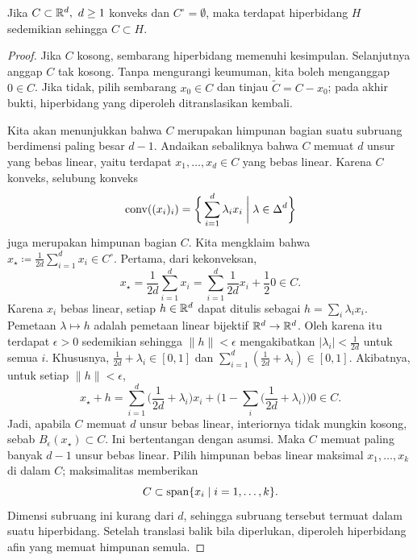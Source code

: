 \begin{lemma}
    Jika $C\subset\mathbb{R}^d,\ d\geq 1$ konveks dan $C^\circ=\emptyset$, maka terdapat hiperbidang $H$ sedemikian sehingga $C\subset H$.
\end{lemma}
\begin{proof}
    Jika \(C\) kosong, sembarang hiperbidang memenuhi kesimpulan. Selanjutnya anggap \(C\) tak kosong. Tanpa mengurangi keumuman, kita boleh menganggap $0\in C$. Jika tidak, pilih sembarang $x_0\in C$ dan tinjau $\widetilde{C}=C-x_0$; pada akhir bukti, hiperbidang yang diperoleh ditranslasikan kembali.

    Kita akan menunjukkan bahwa $C$ merupakan himpunan bagian suatu subruang berdimensi paling besar $d-1$. Andaikan sebaliknya bahwa $C$ memuat $d$ unsur yang bebas linear, yaitu terdapat $x_1,\dots,x_d\in C$ yang bebas linear. Karena $C$ konveks, selubung konveks
    \begin{equation}
        \operatorname{\mathrm{conv}}((x_i)_i)=\bigg\{ \sum_{i=1}^d\lambda_i x_i\;\bigg|\; \lambda\in \Delta^d\bigg\}
    \end{equation}
    juga merupakan himpunan bagian $C$. Kita mengklaim bahwa $x_\star\coloneqq\frac{1}{2d}\sum_{i=1}^d x_i\in C^\circ$. Pertama, dari kekonveksan,
    \[
        x_\star=\frac{1}{2d}\sum_{i=1}^d x_i = \sum_{i=1}^d \frac{1}{2d} x_i + \frac{1}{2}0 \in C.
    \]
    Karena $x_i$ bebas linear, setiap $h\in\mathbb{R}^d$ dapat ditulis sebagai $h=\sum_i \lambda_i x_i$. Pemetaan $\lambda\mapsto h$ adalah pemetaan linear bijektif $\mathbb{R}^d\rightarrow\mathbb{R}^d$. Oleh karena itu terdapat $\epsilon>0$ sedemikian sehingga $\|h\|<\epsilon$ mengakibatkan $|\lambda_i|<\frac{1}{2d}$ untuk semua $i$. Khususnya, $\frac{1}{2d}+\lambda_i\in[0,1]$ dan $\sum_{i=1}^d(\frac{1}{2d}+\lambda_i)\in[0,1]$.
    Akibatnya, untuk setiap $\|h\|<\epsilon$,
    \begin{equation}
        x_\star+h = \sum_{i=1}^d \big(\frac{1}{2d} + \lambda_i\big) x_i + \bigg(1 - \sum_i\big(\frac{1}{2d} + \lambda_i\big) \bigg)0\in C.
    \end{equation}
    Jadi, apabila $C$ memuat $d$ unsur bebas linear, interiornya tidak mungkin kosong, sebab $B_\epsilon(x_\star)\subset C$. Ini bertentangan dengan asumsi. Maka $C$ memuat paling banyak $d-1$ unsur bebas linear. Pilih himpunan bebas linear maksimal $x_1,\dots,x_k$ di dalam \(C\); maksimalitas memberikan
    \[
        C\subset \operatorname{\mathrm{span}} \{ x_i\mid i=1,\dots,k\}.
    \]
    Dimensi subruang ini kurang dari \(d\), sehingga subruang tersebut termuat dalam suatu hiperbidang. Setelah translasi balik bila diperlukan, diperoleh hiperbidang afin yang memuat himpunan semula.
\end{proof}

